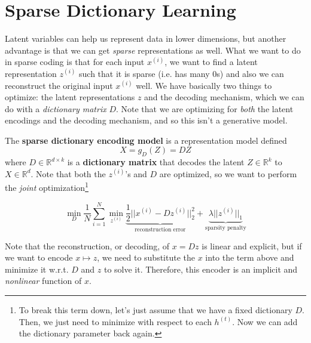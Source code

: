 \section{Sparse Dictionary Learning} 

  Latent variables can help us represent data in lower dimensions, but another advantage is that we can get \textit{sparse} representations as well. What we want to do in sparse coding is that for each input $x^{(i)}$, we want to find a latent representation $z^{(i)}$ such that it is sparse (i.e. has many $0$s) and also we can reconstruct the original input $x^{(i)}$ well. We have basically two things to optimize: the latent representations $z$ and the decoding mechanism, which we can do with a \textit{dictionary matrix} $D$. Note that we are optimizing for \textit{both} the latent encodings and the decoding mechanism, and so this isn't a generative model. 

  \begin{definition}
    The \textbf{sparse dictionary encoding model} is a representation model defined 
    \begin{equation}
      X = g_{D}(Z) = D Z
    \end{equation}
    where $D \in \mathbb{R}^{d \times k}$ is a \textbf{dictionary matrix} that decodes the latent $Z \in \mathbb{R}^k$ to $X \in \mathbb{R}^d$. Note that both the $z^{(i)}$'s and $D$ are optimized, so we want to perform the \textit{joint} optimization\footnote{To break this term down, let's just assume that we have a fixed dictionary $D$. Then, we just need to minimize with respect to each $h^{(t)}$. Now we can add the dictionary parameter back again. }

    \begin{equation}
      \min_{D} \frac{1}{N} \sum_{i=1}^N \min_{z^{(i)}} \underbrace{\frac{1}{2} ||x^{(i)} - D z^{(i)}||_2^2}_{\text{reconstruction error}} + \underbrace{\lambda ||z^{(i)}||_1}_{\text{sparsity penalty}}
    \end{equation}
  \end{definition}

  Note that the reconstruction, or decoding, of $x = Dz$ is linear and explicit, but if we want to encode $x \mapsto z$, we need to substitute the $x$ into the term above and minimize it w.r.t. $D$ and $z$ to solve it. Therefore, this encoder is an implicit and \textit{nonlinear} function of $x$. 

